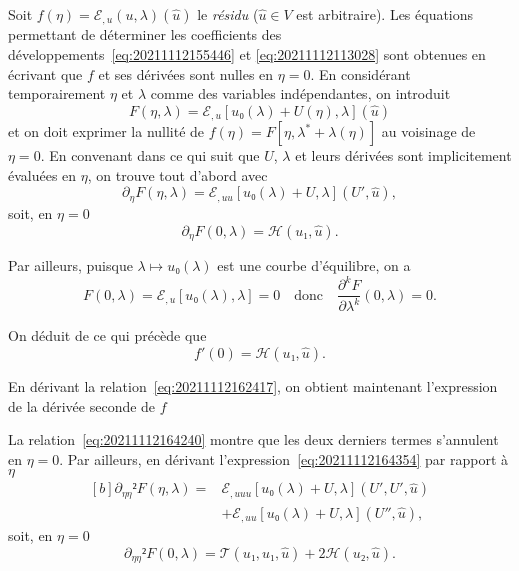 \documentclass[12pt, final]{amsart}
\begin{document}
Soit \(f(η)=ℰ_{,u}(u, λ)(\hat{u})\) le \emph{résidu} (\(\hat{u}∈V\) est
arbitraire). Les équations permettant de déterminer les coefficients des
développements~\eqref{eq:20211112155446} et \eqref{eq:20211112113028} sont
obtenues en écrivant que \(f\) et ses dérivées sont nulles en \(η=0\). En
considérant temporairement \(η\) et \(λ\) comme des variables indépendantes, on
introduit
\begin{equation}
  F(η, λ)=ℰ_{,u}[u₀(λ)+U(η), λ](\hat{u})
\end{equation}
et on doit exprimer la nullité de \(f(η)=F[η, λ^*+λ(η)]\) au voisinage de
\(η=0\). En convenant dans ce qui suit que \(U\), \(λ\) et leurs dérivées sont
implicitement évaluées en \(η\), on trouve tout d'abord avec
\begin{equation}
  \label{eq:20211112164354}
  ∂_η F(η, λ)=ℰ_{,uu}[u₀(λ)+U, λ](U', \hat{u}),
\end{equation}
soit, en \(η=0\)
\begin{equation}
  \label{eq:20211112165323}
  ∂_η F(0, λ)=ℋ(u₁, \hat{u}).
\end{equation}

Par ailleurs, puisque \(λ\mapsto u₀(λ)\) est une courbe d'équilibre, on a
\begin{equation}
  \label{eq:20211112164240}
  F(0, λ)=ℰ_{,u}[u₀(λ), λ]=0\quad\text{donc}\quad\frac{∂^kF}{∂λ^k}(0, λ)=0.
\end{equation}

On déduit de ce qui précède que
\begin{equation}
  \label{eq:20211112182300}
  f'(0)=ℋ(u₁, \hat{u}).
\end{equation}

En dérivant la relation~\eqref{eq:20211112162417}, on obtient maintenant
l'expression de la dérivée seconde de \(f\)

La relation~\eqref{eq:20211112164240} montre que les deux derniers termes
s'annulent en \(η=0\). Par ailleurs, en dérivant
l'expression~\eqref{eq:20211112164354} par rapport à \(η\)
\begin{equation}
  \label{eq:20211112172446}
  \begin{aligned}[b]
    ∂_{ηη}²F(η, λ)={}&ℰ_{,uuu}[u₀(λ)+U, λ](U', U', \hat{u})\\
    &+ℰ_{,uu}[u₀(λ)+U, λ](U'', \hat{u}),
  \end{aligned}
\end{equation}
soit, en \(η=0\)
\begin{equation}
  \label{eq:20211112165830}
  ∂_{ηη}²F(0, λ)=𝒯(u₁, u₁, \hat{u})+2ℋ(u₂, \hat{u}).
\end{equation}
\end{document}
